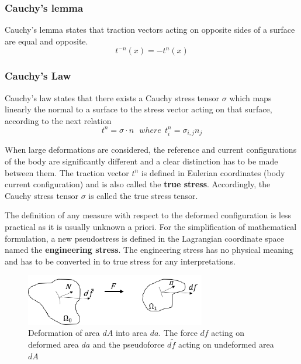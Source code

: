 \subsubsection*{Cauchy's lemma}

Cauchy's lemma states that traction vectors acting on opposite sides of a surface are equal and opposite.
\begin{equation}
t^{-n}(x) = -t^n(x)
\label{chauchyLemma}
\end{equation}
\subsubsection*{Cauchy's Law}
Cauchy’s law states that there exists a Cauchy stress tensor $\sigma$ which maps linearly the normal to a surface to the stress vector acting on that surface, according to the next relation
\begin{equation}
t^n = \sigma \cdot n \ \ \ where \  \ t^n_i = \sigma_{i,j} n_j
\end{equation}

When large deformations are considered, the reference and current configurations of the body are significantly different and a clear distinction has to be made between them. The traction vector $t^n$ is defined in Eulerian coordinates (body current configuration) and is also called the \textbf{true stress}. Accordingly, the Cauchy stress tensor $\sigma$ is called the true stress tensor.

The definition of any measure with respect to the deformed configuration is less practical as it is usually unknown a priori. For the simplification of mathematical formulation, a new pseudostress is defined in the Lagrangian coordinate space named the \textbf{engineering stress}. The engineering stress has no physical meaning and has to be converted in to true stress for any interpretations.


\begin{figure}
\begin{center}
\includegraphics[width=0.7\textwidth,keepaspectratio]{figures/stressnotion.png} 
\caption[]{Deformation of area $dA$  into area $da$. The force $df$ acting on deformed area $da$ and the pseudoforce $d\tilde{f}$ acting on undeformed area $dA$}
\label{stressnotion}
\end{center}
\end{figure} 


